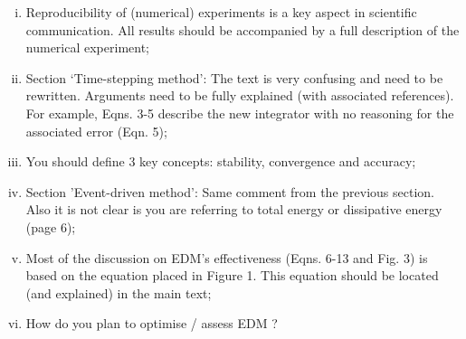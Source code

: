 \documentclass[14pt,twoside]{report}
\begin{document}
\begin{enumerate}[A.]
       \begin{enumerate}[i)]
          \item Reproducibility of (numerical) experiments is a key aspect in scientific communication. All results should be accompanied by a full description of the numerical experiment;
          \item Section `Time-stepping method': The text is very confusing and need to be rewritten. Arguments need to be fully explained (with associated references). For example, Eqns. 3-5 describe the new integrator with no reasoning for the associated error (Eqn. 5);
          \item You should define 3 key concepts: stability, convergence and accuracy;
          \item Section 'Event-driven method': Same comment from the previous section.  Also it is not clear is you are referring to total energy or dissipative energy (page 6);
          \item Most of the discussion on EDM's effectiveness (Eqns. 6-13 and Fig. 3) is based on the equation placed in Figure 1. This equation should be located (and explained) in the main text; 
          \item How do you plan to optimise / assess EDM ? 
       \end{enumerate}
%
\end{enumerate}
   
\end{document}
